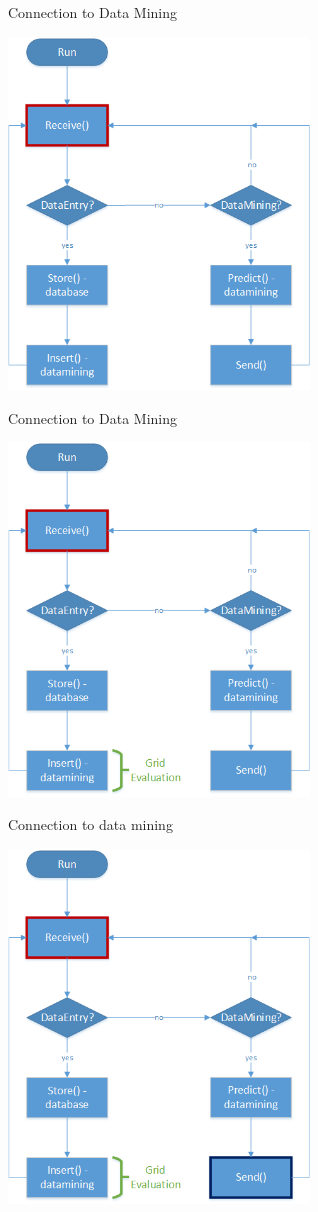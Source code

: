 	\begin{frame}{Connection to Data Mining}
		\begin{center}
	\includegraphics[height=0.64\textwidth, width=0.6\textwidth]{images/datamining_flow0.png}
	\end{center}
	\end{frame}
	
	\begin{frame}{Connection to Data Mining}
		\begin{center}
	\includegraphics[height=0.64\textwidth, width=0.6\textwidth]{images/datamining_flow2.png}
	\end{center}
	\end{frame}
	
	\begin{frame}{Connection to data mining}
		\begin{center}
	\includegraphics[height=0.64\textwidth, width=0.6\textwidth]{images/datamining_flow3.png}
	\end{center}
	\end{frame}
